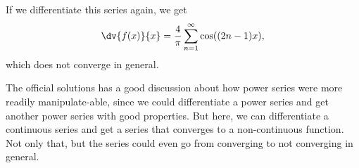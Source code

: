{{If we differentiate this series again, we get 
\begin{equation*}
  \dv{f(x)}{x} = 
  \frac{4}{\pi}\sum_{n=1}^\infty \cos((2n-1)x),
\end{equation*}
which does not converge in general.

The official solutions has a good discussion about how 
power series were more readily manipulate-able, since 
we could differentiate a power series and get another power series 
with good properties. But here, we can differentiate a continuous 
series and get a series that converges to a non-continuous function.
Not only that, but the series could even go from converging to 
not converging in general.
}
}


